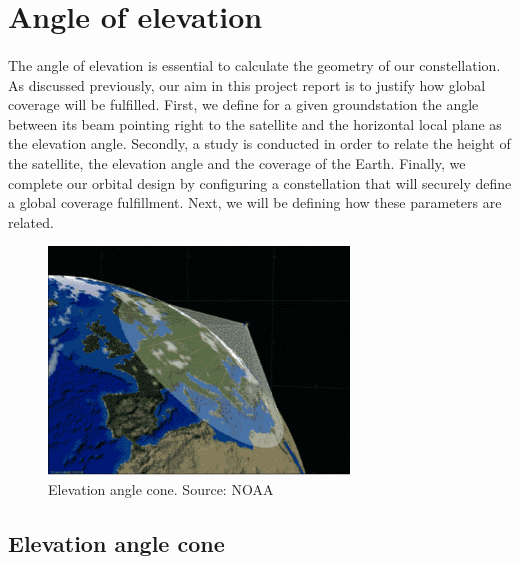 \documentclass{article}
\begin{document}
\section{Angle of elevation}

\paragraph{ }

The angle of elevation is essential to calculate the geometry of our constellation. As discussed previously, our aim in this project report is to justify how global coverage will be fulfilled. First, we define for a given groundstation the angle between its beam pointing right to the satellite and the horizontal local plane as the elevation angle. Secondly, a study is conducted in order to relate the height of the satellite, the elevation angle and the coverage of the Earth. Finally, we complete our orbital design by configuring a constellation that will securely define a global coverage fulfillment. Next, we will be defining how these parameters are related. 

\begin{figure}[h]
\includegraphics[width=8cm]{noaa}
\centering
\caption{Elevation angle cone. Source: NOAA}
\end{figure}

\subsection{Elevation angle cone}

\paragraph{ }
\end{document}
